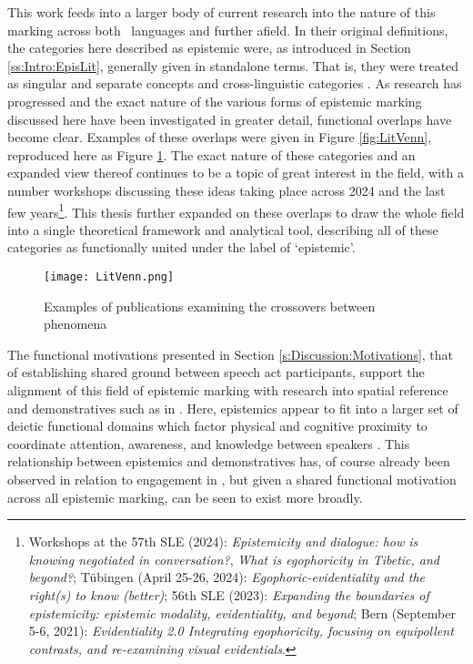 This work feeds into a larger body of current research into the nature of this marking across both \lfam\ languages and further afield. In their original definitions, the categories here described as epistemic were, as introduced in Section \ref{ss:Intro:EpisLit}, generally given in standalone terms. That is, they were treated as singular and separate concepts and cross-linguistic categories \cites{ChafeNichols1986}{DeLanceyMirativity1997}{Tournadre1992}{EvansBergqvistSanRoque2018a}. As research has progressed and the exact nature of the various forms of epistemic marking discussed here have been investigated in greater detail, functional overlaps have become clear. Examples of these overlaps were given in Figure \ref{fig:LitVenn}, reproduced here as Figure \ref{f:Conclusion:LitVenn}. The exact nature of these categories and an expanded view thereof continues to be a topic of great interest in the field, with a number workshops discussing these ideas taking place across 2024 and the last few years\footnote{Workshops at the 57th SLE (2024): \textit{Epistemicity and dialogue: how is knowing negotiated in conversation?}, \textit{What is egophoricity in Tibetic, and beyond?}; Tübingen (April 25-26, 2024): \textit{Egophoric-evidentiality and the right(s) to know (better)}; 56th SLE (2023): \textit{Expanding the boundaries of epistemicity: epistemic modality, evidentiality, and beyond}; Bern (September 5-6, 2021): \textit{Evidentiality 2.0 Integrating egophoricity, focusing on equipollent contrasts, and re-examining visual evidentials}.}. This thesis further expanded on these overlaps to draw the whole field into a single theoretical framework and analytical tool, describing all of these categories as functionally united under the label of `epistemic'.

\begin{figure}
    \centering
    \texttt{[image: LitVenn.png]}
    \caption{Examples of publications examining the crossovers between phenomena}
    \label{f:Conclusion:LitVenn}
\end{figure}

The functional motivations presented in Section \ref{s:Discussion:Motivations}, that of establishing shared ground between speech act participants, support the alignment of this field of epistemic marking with research into spatial reference and demonstratives such as in . Here, epistemics appear to fit into a larger set of deictic functional domains which factor physical and cognitive proximity to coordinate attention, awareness, and knowledge between speakers \cite{Peeters2016}. This relationship between epistemics and demonstratives has, of course already been observed in relation to engagement in , but given a shared functional motivation across all epistemic marking, can be seen to exist more broadly.


